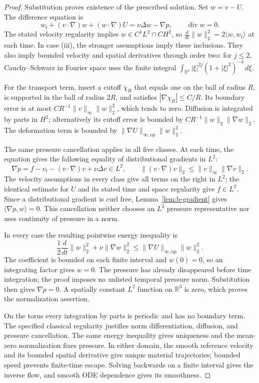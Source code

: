 \begin{proof}
Substitution proves existence of the prescribed solution. Set $w=v-U$.
The difference equation is
\[
 w_t+(v\cdot\nabla)w+(w\cdot\nabla)U
    =\nu\Delta w-\nabla p,\qquad \operatorname{div}w=0.
\]
The stated velocity regularity implies $w\in C^1L^2\cap CH^2$, so
$\frac d{dt}\|w\|_2^2=2\langle w,w_t\rangle$ at each time. In case
(iii), the stronger assumptions imply these inclusions. They also imply
bounded velocity and spatial derivatives through order two: for $j\le2$,
Cauchy--Schwarz in Fourier space uses the finite integral
$\int_{\mathbb R^3}|\xi|^{2j}(1+|\xi|^2)^{-4}\,d\xi$.

For the transport term, insert a cutoff $\chi_R$ that equals one on the
ball of radius $R$, is supported in the ball of radius $2R$, and satisfies
$|\nabla\chi_R|\le C/R$. Its boundary error is at most
$CR^{-1}\|v\|_\infty\|w\|_2^2$, which tends to zero. Diffusion is
integrated by parts in $H^2$; alternatively its cutoff error is bounded by
$CR^{-1}\|w\|_2\|\nabla w\|_2$. The deformation term is bounded by
$\|\nabla U\|_{\infty,\mathrm{op}}\|w\|_2^2$.

The same pressure cancellation applies in all five classes. At each time,
the equation gives the following equality of distributional gradients in
$L^2$:
\[
 \nabla p=f-v_t-(v\cdot\nabla)v+\nu\Delta v\in L^2,
 \qquad \|(v\cdot\nabla)v\|_2\le\|v\|_\infty\|\nabla v\|_2.
\]
The velocity assumptions in every class give all terms on the right in
$L^2$; the identical estimate for $U$ and its stated time and space
regularity give $f\in L^2$. Since a distributional gradient is curl free,
Lemma~\ref{lem:b-gradient} gives $\langle\nabla p,w\rangle=0$.
This cancellation neither chooses an $L^2$ pressure representative nor
uses continuity of pressure in a norm.

In every case the resulting pointwise energy inequality is
\[
 \frac12\frac d{dt}\|w\|_2^2+\nu\|\nabla w\|_2^2
 \le \|\nabla U\|_{\infty,\mathrm{op}}\|w\|_2^2.
\]
The coefficient is bounded on each finite interval and $w(0)=0$, so an
integrating factor gives $w=0$. The pressure has already disappeared before
time integration; the proof imposes no unlisted temporal pressure norm.
Substitution then gives $\nabla p=0$. A spatially constant $L^2$ function
on $\mathbb R^3$ is zero, which proves the normalization assertion.

On the torus every integration by parts is periodic and has no boundary
term. The specified classical regularity justifies norm differentiation,
diffusion, and pressure cancellation. The same energy inequality gives
uniqueness and the mean-zero normalization fixes pressure. In either domain,
the smooth reference velocity and its bounded spatial derivative give
unique material trajectories; bounded speed prevents finite-time escape.
Solving backwards on a finite interval gives the inverse flow, and smooth
ODE dependence gives its smoothness.
\end{proof}

